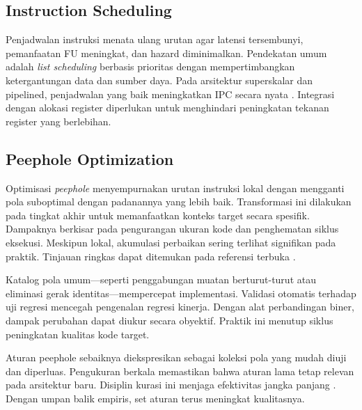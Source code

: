 \documentclass[../main.tex]{subfiles}
\begin{document}
\subsection{Instruction Scheduling}
Penjadwalan instruksi menata ulang urutan agar latensi tersembunyi, pemanfaatan FU meningkat, dan hazard diminimalkan. Pendekatan umum adalah \emph{list scheduling} berbasis prioritas dengan mempertimbangkan ketergantungan data dan sumber daya. Pada arsitektur superskalar dan pipelined, penjadwalan yang baik meningkatkan IPC secara nyata \citep{WikiInstructionScheduling}. Integrasi dengan alokasi register diperlukan untuk menghindari peningkatan tekanan register yang berlebihan.

\subsection{Peephole Optimization}
Optimisasi \emph{peephole} menyempurnakan urutan instruksi lokal dengan mengganti pola suboptimal dengan padanannya yang lebih baik. Transformasi ini dilakukan pada tingkat akhir untuk memanfaatkan konteks target secara spesifik. Dampaknya berkisar pada pengurangan ukuran kode dan penghematan siklus eksekusi. Meskipun lokal, akumulasi perbaikan sering terlihat signifikan pada praktik. Tinjauan ringkas dapat ditemukan pada referensi terbuka \citep{WikiPeephole}.

Katalog pola umum—seperti penggabungan muatan berturut-turut atau eliminasi gerak identitas—mempercepat implementasi. Validasi otomatis terhadap uji regresi mencegah pengenalan regresi kinerja. Dengan alat perbandingan biner, dampak perubahan dapat diukur secara obyektif. Praktik ini menutup siklus peningkatan kualitas kode target.

Aturan peephole sebaiknya diekspresikan sebagai koleksi pola yang mudah diuji dan diperluas. Pengukuran berkala memastikan bahwa aturan lama tetap relevan pada arsitektur baru. Disiplin kurasi ini menjaga efektivitas jangka panjang \citep{WikiPeephole}. Dengan umpan balik empiris, set aturan terus meningkat kualitasnya.
\end{document}
